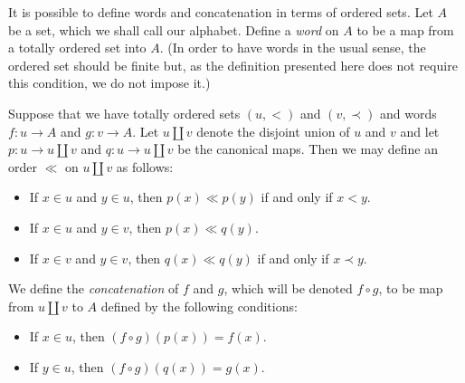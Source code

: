 \documentclass[12pt]{article}
\begin{document}
It is possible to define words and concatenation in terms of ordered sets.  Let $A$
be a set, which we shall call our alphabet.  Define a \emph{word} on $A$ to be a map 
from a totally ordered set into $A$.  (In order to have words in the usual sense, the
ordered set should be finite but, as the definition presented here does not require 
this condition, we do not impose it.)

Suppose that we have totally ordered sets $(u,<)$ and $(v,\prec)$ and words $f \colon u \to A$
and $g \colon v \to A$.  Let $u \coprod v$ denote the disjoint union of $u$ and $v$ and let
$p \colon u \to u \coprod v$ and $q \colon u \to u \coprod v$ be the canonical maps.  Then
we may define an order $\ll$ on $u \coprod v$ as follows:
\begin{itemize}
\item If $x \in u$ and $y \in u$, then $p(x) \ll p(y)$ if and only if $x < y$.
\item If $x \in u$ and $y \in v$, then $p(x) \ll q(y)$.
\item If $x \in v$ and $y \in v$, then $q(x) \ll q(y)$ if and only if $x \prec y$.
\end{itemize}
We define the \emph{concatenation} of $f$ and $g$, which will be denoted $f \circ g$, to be
map from $u \coprod v$ to $A$ defined by the following conditions:
\begin{itemize}
\item If $x \in u$, then $(f \circ g) (p(x)) = f(x)$.
\item If $y \in u$, then $(f \circ g) (q(x)) = g(x)$.
\end{itemize}
\end{document}
